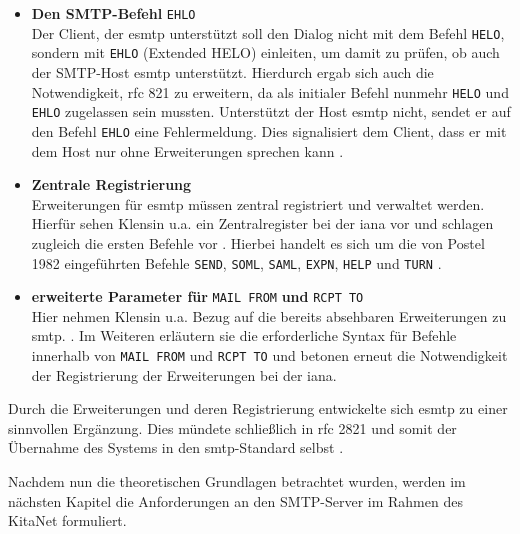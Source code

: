 \begin{itemize}
	\item \textbf{Den SMTP-Befehl} \verb+EHLO+\\
	Der Client, der \ac{esmtp} unterstützt soll den Dialog nicht mit dem Befehl \verb+HELO+, sondern mit \verb+EHLO+ (Extended HELO) einleiten, um damit zu prüfen, ob auch der SMTP-Host \ac{esmtp} unterstützt. Hierdurch ergab sich auch die Notwendigkeit, \ac{rfc} 821 zu erweitern, da als initialer Befehl nunmehr \verb+HELO+ und \verb+EHLO+ zugelassen sein mussten. Unterstützt der Host \ac{esmtp} nicht, sendet er auf den Befehl \verb+EHLO+ eine Fehlermeldung. Dies signalisiert dem Client, dass er mit dem Host nur ohne Erweiterungen sprechen kann \citep[vgl.][S. 3 ff.]{rfc1869}.
	\item \textbf{Zentrale Registrierung}\\
	Erweiterungen für \ac{esmtp} müssen zentral registriert und verwaltet werden. Hierfür sehen Klensin u.a. ein Zentralregister bei der \ac{iana} vor und schlagen zugleich die ersten Befehle vor \citep[vgl.][7]{rfc1869}. Hierbei handelt es sich um die von Postel 1982 eingeführten Befehle \verb+SEND+, \verb+SOML+, \verb+SAML+, \verb+EXPN+, \verb+HELP+ und \verb+TURN+ \citep[für die Befehle vgl.][S. 23 ff.]{rfc821}.
	\item \textbf{erweiterte Parameter für} \verb+MAIL FROM+ \textbf{und} \verb+RCPT TO+\\
	Hier nehmen Klensin u.a. Bezug auf die bereits absehbaren Erweiterungen zu \ac{smtp}.  \citep[][7]{rfc1869}. Im Weiteren erläutern sie die erforderliche Syntax für Befehle innerhalb von \verb+MAIL FROM+ und \verb+RCPT TO+ und betonen erneut die Notwendigkeit der Registrierung der Erweiterungen bei der \ac{iana}.
\end{itemize}

Durch die Erweiterungen und deren Registrierung entwickelte sich \ac{esmtp} zu einer sinnvollen Ergänzung. Dies mündete schließlich in \ac{rfc} 2821 und somit der Übernahme des Systems in den \ac{smtp}-Standard selbst \citep[vgl. u.a.][S. 7 ff.]{rfc2821}.

Nachdem nun die theoretischen Grundlagen betrachtet wurden, werden im nächsten Kapitel die Anforderungen an den SMTP-Server im Rahmen des KitaNet formuliert. 





